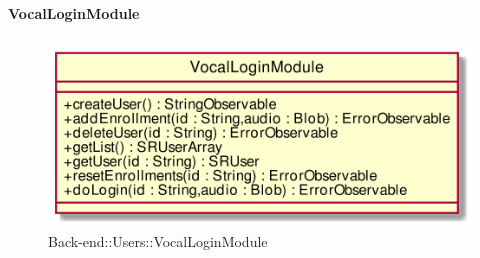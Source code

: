 \FloatBarrier

\hypertarget{VocalLoginModule_label}{\paragraph{VocalLoginModule}}
\begin{figure}[h]
	\centering
	\includegraphics[width=\textwidth,height=\textheight,keepaspectratio]{images/Class_VocalLoginModule.png}
	\caption{Back-end::Users::VocalLoginModule}
\end{figure}
